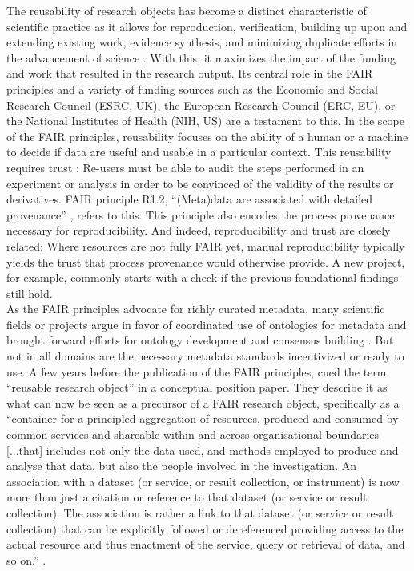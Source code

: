 The reusability of research objects has become a distinct characteristic of scientific practice as it allows for reproduction, verification, building up upon and extending existing work, evidence synthesis, and minimizing duplicate efforts in the advancement of science \citep{thanos2017research}.
With this, it maximizes the impact of the funding and work that resulted in the research output.
Its central role in the \gls{FAIR} principles \citep{wilkinson2016fair} and a variety of funding sources such as the Economic and Social Research Council (ESRC, UK), the European Research Council (ERC, EU), or the National Institutes of Health (NIH, US) are a testament to this.
In the scope of the FAIR principles, reusability focuses on the ability of a human or a machine to decide if data are useful and usable in a particular context.
This reusability requires trust \citep{bechhofer2013linked}: Re-users must be able to audit the steps performed in an experiment or analysis in order to be convinced of the validity of the results or derivatives.
FAIR principle R1.2, ``(Meta)data are associated with detailed provenance'' \citep{wilkinson2016fair}, refers to this.
This principle also encodes the process provenance necessary for reproducibility.
And indeed, reproducibility and trust are closely related:
Where resources are not fully FAIR yet, manual reproducibility typically yields the trust that process provenance would otherwise provide.
A new project, for example, commonly starts with a check if the previous foundational findings still hold.\\
As the FAIR principles advocate for richly curated metadata, many scientific fields or projects argue in favor of coordinated use of ontologies for metadata and brought forward efforts for ontology development and consensus building \citep[e.g.,][]{wise2019implementation, abrams2022standards, papadiamantis2020metadata}.
But not in all domains are the necessary metadata standards incentivized or ready to use.
A few years before the publication of the FAIR principles, \citet{bechhofer2010research} cued the term ``reusable research object'' in a conceptual position paper.
They describe it as what can now be seen as a precursor of a FAIR research object, specifically as a ``container for a principled aggregation of resources, produced and consumed by common services and shareable within and across organisational boundaries [...that] includes not only the data used, and methods employed to produce and analyse that data, but also the people involved in the investigation. An association with a dataset (or service, or result collection, or instrument) is now more than just a citation or reference to that dataset (or service or result collection). The association is rather a link to that dataset (or service or result collection) that can be explicitly followed or dereferenced providing access to the actual resource and thus enactment of the service, query or retrieval of data, and so on.'' \citep{bechhofer2010research}.
